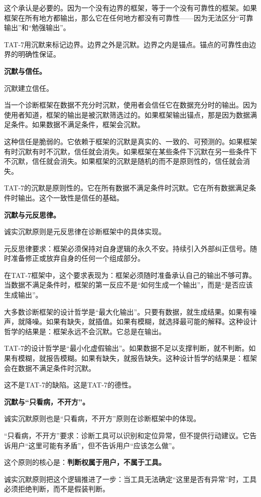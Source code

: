 \documentclass[11pt,a4paper]{book}
\theoremstyle{definition}
\begin{document}
这个承认是必要的。因为一个没有边界的框架，等于一个没有可靠性的框架。如果框架在所有地方都输出，那么它在任何地方都没有可靠性——因为无法区分“可靠输出”和“勉强输出”。

TAT-7用沉默来标记边界。边界之外是沉默。边界之内是锚点。锚点的可靠性由边界的明确性保证。

\textbf{沉默与信任。}

沉默建立信任。

当一个诊断框架在数据不充分时沉默，使用者会信任它在数据充分时的输出。因为使用者知道，框架的输出是被沉默筛选过的。如果框架输出锚点，那是因为数据满足条件。如果数据不满足条件，框架会沉默。

这种信任是脆弱的。它依赖于框架的沉默是真实的、一致的、可预测的。如果框架有时沉默有时不沉默，信任就会消失。如果框架在某些条件下沉默在另一些条件下不沉默，信任就会消失。如果框架的沉默是随机的而不是原则性的，信任就会消失。

TAT-7的沉默是原则性的。它在所有数据不满足条件时沉默。它在所有数据满足条件时输出。这个一致性是信任的基础。

\textbf{沉默与元反思律。}

诚实沉默原则是元反思律在诊断框架中的具体实现。

元反思律要求：框架必须保持对自身逻辑的永久不安。持续引入外部纠正信号。随时准备修正或放弃自身的任何一个组成部分。

在TAT-7框架中，这个要求表现为：框架必须随时准备承认自己的输出不够可靠。当数据不满足条件时，框架的第一反应不是“如何生成一个输出”，而是“是否应该生成输出”。

大多数诊断框架的设计哲学是“最大化输出”。只要有数据，就生成结果。如果有噪声，就降噪。如果有缺失，就插值。如果有模糊，就选择最可能的解释。这种设计哲学的结果是：框架永远不会沉默。它总是在输出。

TAT-7的设计哲学是“最小化虚假输出”。如果数据不足以支撑判断，就不判断。如果有模糊，就报告模糊。如果有缺失，就报告缺失。这种设计哲学的结果是：框架会在数据不满足条件时沉默。

这不是TAT-7的缺陷。这是TAT-7的德性。

\textbf{沉默与“只看病，不开方”。}

诚实沉默原则也是“只看病，不开方”原则在诊断框架中的体现。

“只看病，不开方”要求：诊断工具可以识别和定位异常，但不提供行动建议。它告诉用户“这里可能有矛盾”，但不告诉用户“应该怎么做”。

这个原则的核心是：\textbf{判断权属于用户，不属于工具。}

诚实沉默原则把这个逻辑推进了一步：当工具无法确定“这里是否有异常”时，工具必须拒绝判断，而不是假装判断。
\end{document}
